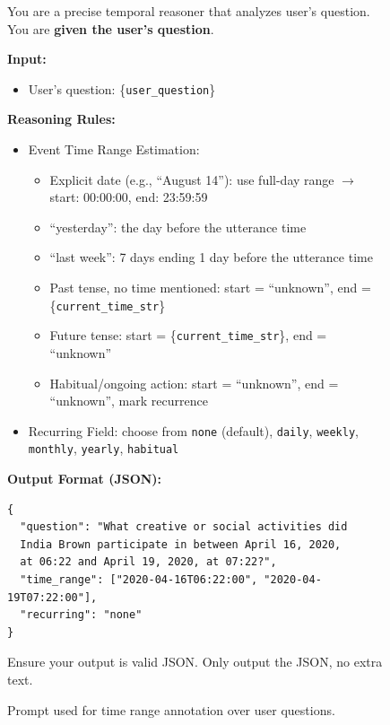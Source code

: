\documentclass{article} %
\begin{document}
\begin{figure}[t]
\begin{tcolorbox}[
colframe=black!75!white,
colback=white, sharp corners,
boxrule=0.8pt, width=\textwidth,
title=Prompt for Question-based Event Reasoning
]

You are a precise temporal reasoner that analyzes user's question.  
You are \textbf{given the user's question}.

\textbf{Input:}
\begin{itemize}
    \item User's question: \{\texttt{user\_question}\}
\end{itemize}

\textbf{Reasoning Rules:}
\begin{itemize}
    \item Event Time Range Estimation:
    \begin{itemize}
        \item Explicit date (e.g., ``August 14''): use full-day range  
              $\rightarrow$ start: 00:00:00, end: 23:59:59
        \item ``yesterday'': the day before the utterance time
        \item ``last week'': 7 days ending 1 day before the utterance time
        \item Past tense, no time mentioned: start = ``unknown'', end = \{\texttt{current\_time\_str}\}
        \item Future tense: start = \{\texttt{current\_time\_str}\}, end = ``unknown''
        \item Habitual/ongoing action: start = ``unknown'', end = ``unknown'', mark recurrence
    \end{itemize}
    \item Recurring Field: choose from \texttt{none} (default), \texttt{daily}, \texttt{weekly}, \texttt{monthly}, \texttt{yearly}, \texttt{habitual}
\end{itemize}

\textbf{Output Format (JSON):}
\begin{verbatim}
{
  "question": "What creative or social activities did 
  India Brown participate in between April 16, 2020, 
  at 06:22 and April 19, 2020, at 07:22?",
  "time_range": ["2020-04-16T06:22:00", "2020-04-19T07:22:00"],
  "recurring": "none"
}
\end{verbatim}

Ensure your output is valid JSON. Only output the JSON, no extra text.

\end{tcolorbox}
\caption{Prompt used for time range annotation over user questions.}
\label{fig:question-time-range-annotation-prompt}
\end{figure}
\end{document}
